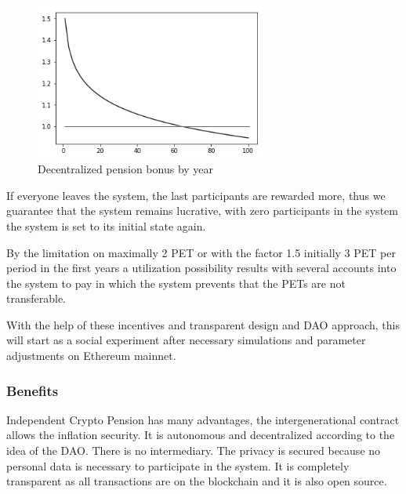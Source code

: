 \begin{figure}[H]
    \centering
    \includegraphics[width=3.0in]{img/pension_bonus.png}
    \caption{Decentralized pension bonus by year}
    \label{fig:pension_bonus}
\end{figure}

If everyone leaves the system, the last participants are rewarded more, thus we guarantee that the system remains lucrative, with zero participants in the system the system is set to its initial state again.

By the limitation on maximally 2 PET or with the factor 1.5 initially 3 PET per period in the first years a utilization possibility results with several accounts into the system to pay in which the system prevents that the PETs are not transferable. 

With the help of these incentives and transparent design and DAO approach, this will start as a social experiment after necessary simulations and parameter adjustments on Ethereum mainnet.

\subsubsection*{Benefits}
Independent Crypto Pension has many advantages, the intergenerational contract allows the inflation security. It is autonomous and decentralized according to the idea of the DAO. There is no intermediary.  The privacy is secured because no personal data is necessary to participate in the system.  It is completely transparent as all transactions are on the blockchain and it is also open source.